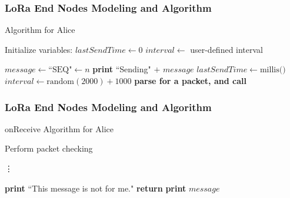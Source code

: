 \documentclass{beamer}
\begin{document}
\begin{frame}
  \frametitle{LoRa End Nodes Modeling and Algorithm}
    \begin{algorithm}[H]
      \caption{Algorithm for Alice}\label{alg:Alice}
      \begin{algorithmic}
      \State Initialize variables:
          \State $lastSendTime \gets 0$
          \State $interval \gets$ user-defined interval
          
                  \State $message \gets \text{``SEQ"} \gets n$
                  \State {}
                  \State \textbf{print} ``Sending" $+$ $message$
                  \State $lastSendTime \gets \text{millis()}$
                  \State $interval \gets \text{random}(2000) + 1000$ 
              \EndIf
              \State \textbf{parse for a packet, and call} 
          \EndFunction
      \end{algorithmic}
    \end{algorithm}
\end{frame}

\begin{frame}
  \frametitle{LoRa End Nodes Modeling and Algorithm}
  \begin{algorithm}[H]
    \caption{onReceive Algorithm for Alice}\label{alg:onReceive}
    \begin{algorithmic}

            \State Perform packet checking

            \State \vdots 

                \State \textbf{print} ``This message is not for me."
                \State \textbf{return}
            \EndIf
            \State {}
            \State \textbf{print} $message$
        \EndFunction
    \end{algorithmic}
\end{algorithm}
\end{frame}
\end{document}
